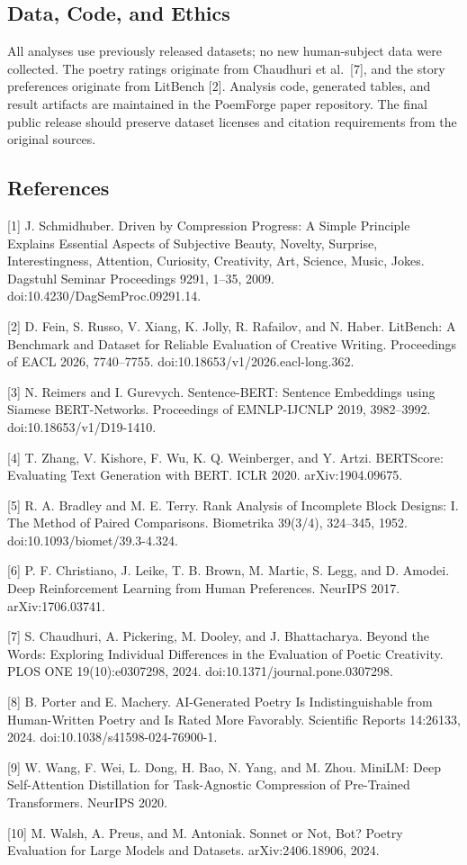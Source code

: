 \documentclass[
]{article}
\begin{document}
\subsection{Data, Code, and Ethics}\label{data-code-and-ethics}

All analyses use previously released datasets; no new human-subject data
were collected. The poetry ratings originate from Chaudhuri et
al.~{[}7{]}, and the story preferences originate from LitBench {[}2{]}.
Analysis code, generated tables, and result artifacts are maintained in
the PoemForge paper repository. The final public release should preserve
dataset licenses and citation requirements from the original sources.

\subsection{References}\label{references}

{[}1{]} J. Schmidhuber. Driven by Compression Progress: A Simple
Principle Explains Essential Aspects of Subjective Beauty, Novelty,
Surprise, Interestingness, Attention, Curiosity, Creativity, Art,
Science, Music, Jokes. Dagstuhl Seminar Proceedings 9291, 1--35, 2009.
doi:10.4230/DagSemProc.09291.14.

{[}2{]} D. Fein, S. Russo, V. Xiang, K. Jolly, R. Rafailov, and N.
Haber. LitBench: A Benchmark and Dataset for Reliable Evaluation of
Creative Writing. Proceedings of EACL 2026, 7740--7755.
doi:10.18653/v1/2026.eacl-long.362.

{[}3{]} N. Reimers and I. Gurevych. Sentence-BERT: Sentence Embeddings
using Siamese BERT-Networks. Proceedings of EMNLP-IJCNLP 2019,
3982--3992. doi:10.18653/v1/D19-1410.

{[}4{]} T. Zhang, V. Kishore, F. Wu, K. Q. Weinberger, and Y. Artzi.
BERTScore: Evaluating Text Generation with BERT. ICLR 2020.
arXiv:1904.09675.

{[}5{]} R. A. Bradley and M. E. Terry. Rank Analysis of Incomplete Block
Designs: I. The Method of Paired Comparisons. Biometrika 39(3/4),
324--345, 1952. doi:10.1093/biomet/39.3-4.324.

{[}6{]} P. F. Christiano, J. Leike, T. B. Brown, M. Martic, S. Legg, and
D. Amodei. Deep Reinforcement Learning from Human Preferences. NeurIPS
2017. arXiv:1706.03741.

{[}7{]} S. Chaudhuri, A. Pickering, M. Dooley, and J. Bhattacharya.
Beyond the Words: Exploring Individual Differences in the Evaluation of
Poetic Creativity. PLOS ONE 19(10):e0307298, 2024.
doi:10.1371/journal.pone.0307298.

{[}8{]} B. Porter and E. Machery. AI-Generated Poetry Is
Indistinguishable from Human-Written Poetry and Is Rated More Favorably.
Scientific Reports 14:26133, 2024. doi:10.1038/s41598-024-76900-1.

{[}9{]} W. Wang, F. Wei, L. Dong, H. Bao, N. Yang, and M. Zhou. MiniLM:
Deep Self-Attention Distillation for Task-Agnostic Compression of
Pre-Trained Transformers. NeurIPS 2020.

{[}10{]} M. Walsh, A. Preus, and M. Antoniak. Sonnet or Not, Bot? Poetry
Evaluation for Large Models and Datasets. arXiv:2406.18906, 2024.
\end{document}
